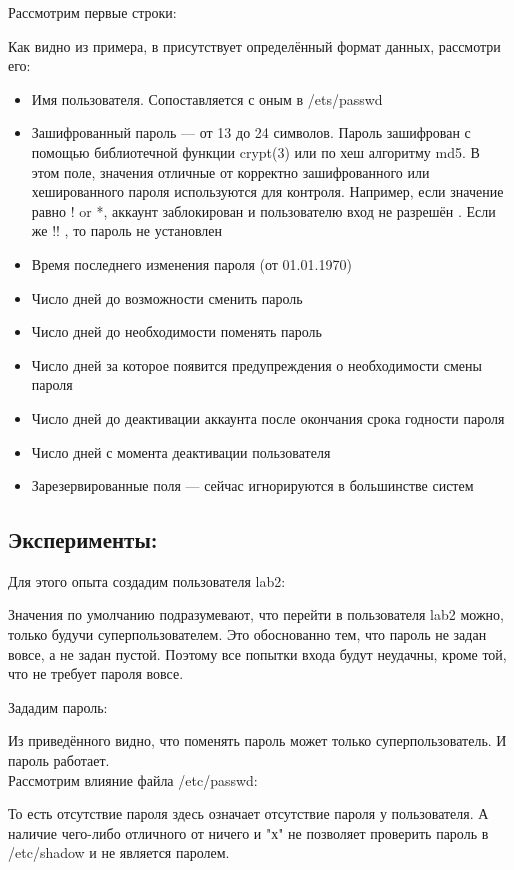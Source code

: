 \documentclass[a4paper]{article}
\begin{document}
Рассмотрим первые строки:

Как видно из примера, в присутствует определённый формат данных, рассмотри его:
\begin{itemize}
\item Имя пользователя. Сопоставляется с оным в /ets/passwd
\item Зашифрованный пароль — от 13 до 24 символов. Пароль зашифрован с помощью библиотечной функции crypt(3) или по хеш алгоритму md5. В этом поле, значения отличные от корректно зашифрованного или хешированного пароля используются для контроля. Например, если значение равно ! or *, аккаунт заблокирован и пользователю вход не разрешён . Если же !! , то пароль не установлен
\item Время последнего изменения пароля (от 01.01.1970)
\item Число дней до возможности сменить пароль
\item Число дней до необходимости поменять пароль
\item Число дней за которое появится предупреждения о необходимости смены пароля
\item Число дней до деактивации аккаунта после окончания срока годности пароля
\item Число дней с момента деактивации пользователя
\item Зарезервированные поля — сейчас игнорируются в большинстве систем
\end{itemize}

\subsection{Эксперименты:}
Для этого опыта создадим пользователя lab2:

Значения по умолчанию подразумевают, что перейти в пользователя lab2 можно, только будучи суперпользователем. Это обоснованно тем, что пароль не задан вовсе, а не задан пустой. Поэтому все попытки входа будут неудачны, кроме той, что не требует пароля вовсе.

Зададим пароль:

Из приведённого видно, что поменять пароль может только суперпользователь. И пароль работает.\\

Рассмотрим влияние файла /etc/passwd:

То есть отсутствие пароля здесь означает отсутствие пароля у пользователя. А наличие чего-либо отличного от ничего и "х" не позволяет проверить пароль в /etc/shadow и не является паролем.
\end{document}
